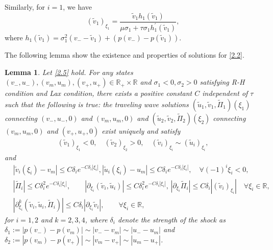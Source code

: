 \documentclass[10pt,reqno]{amsart}
\numberwithin{equation}{section}
\newtheorem{lemma}[theorem]{Lemma}
\begin{document}
Similarly, for $i=1$, we have
\begin{equation}\label{2.6}
(\widetilde{v}_1)_{\xi_1}=\frac{\widetilde{v}_1h_1(\widetilde{v}_1)}{\mu\sigma_1+\tau\sigma_1 h_1^{\prime}(\widetilde{v}_1)},
\end{equation}
where $h_1(\widetilde{v}_1)=\sigma_1^2(v_--\widetilde{v}_1)+(p(v_-)-p(\widetilde{v}_1))$.

The following lemma show the existence and properties of solutions for \eqref{2.2}.
\begin{lemma}\label{le2.1}
Let \eqref{2.5} hold.
 For any states $(v_-,u_-),(v_m,u_m),(v_+,u_+)\in \mathbb{R}_+\times\mathbb{R}$ and $\sigma_1<0,\sigma_2>0$ satisfying R-H condition and Lax condition, there exists a positive constant $C$ independent of $\tau$ such that the following is true: the traveling wave solutions $(\widetilde{u}_1,\widetilde{v}_1,\widetilde{\Pi}_1)(\xi_1)$ connecting $(v_-,u_-,0)$ and $(v_m,u_m,0)$ and $(\widetilde{u}_2,\widetilde{v}_2,\widetilde{\Pi}_2)(\xi_2)$ connecting $(v_m,u_m,0)$ and $(v_+,u_+,0)$ exist uniquely and satisfy
\begin{align*}
(\widetilde{v}_1)_{\xi_1}<0,\quad
(\widetilde{v}_2)_{\xi_2}>0,\quad
(\widetilde{v}_i)_{\xi_i}\sim(\widetilde{u}_i)_{\xi_i},
\end{align*}
and
\begin{align*}
&|\widetilde{v}_i(\xi_i)-v_m|\leq C\delta_i e^{-C\delta_i|\xi_i|},
|\widetilde{u}_i(\xi_i)-u_m|\leq C\delta_i e^{-C\delta_i|\xi_i|},\quad  \forall (-1)^i\xi_i<0,\\
&|\widetilde{\Pi}_i|\leq C\delta_i^2 e^{-C\delta_i|\xi_i|},\quad \quad
|\partial_{\xi_i}(\widetilde{v}_i,\widetilde{u}_i)|\leq C\delta_i^2e^{-C\delta_i|\xi_i|},  \,   |\partial_{\xi_i} \widetilde{\Pi}_i|\le C \delta_i |(\widetilde v_i)_{\xi_i}| \quad \forall\xi_i\in\mathbb{R},\\
&|\partial^k_{\xi_i}(\widetilde{v}_i,\widetilde{u}_i,\widetilde{\Pi}_i)|\leq C\delta_i|\partial_{\xi_i}\widetilde{v}_i|, \qquad \forall\xi_i\in\mathbb{R},
\end{align*}
for $i=1,2$ and $k=2,3,4$, where $\delta_i$ denote the strength of the shock as $\delta_1:=|p(v_-)-p(v_m)|\sim|v_--v_m|\sim|u_--u_m|$ and $\delta_2:=|p(v_m)-p(v_+)|\sim|v_m-v_+|\sim|u_m-u_+|$.
\end{lemma}
\end{document}
